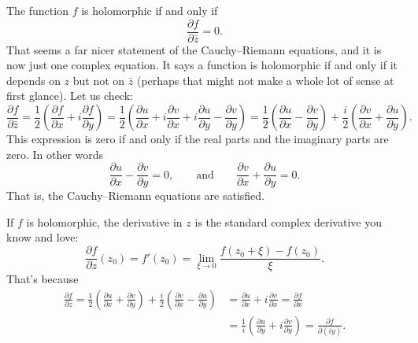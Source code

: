 \documentclass[12pt,openany]{book}
\theoremstyle{plain}
\theoremstyle{remark}
\theoremstyle{definition}
\theoremstyle{exercise}
\theoremstyle{example}
\begin{document}
The function $f$ is holomorphic if and only if
\begin{equation*}
\frac{\partial f}{\partial \bar{z}} = 0 .
\end{equation*}
That seems a far nicer statement of the Cauchy--Riemann equations, and it is
now just one complex equation.  It says
a function is holomorphic if and only if it depends on $z$ but not on
$\bar{z}$ (perhaps that might not make a whole lot of sense at first
glance).
Let us check:
\begin{equation*}
\frac{\partial f}{\partial \bar{z}} 
=
\frac{1}{2}
\left(
\frac{\partial f}{\partial x} + i
\frac{\partial f}{\partial y}
\right)
=
\frac{1}{2}
\left(
\frac{\partial u}{\partial x} 
+ i \frac{\partial v}{\partial x} 
+ i \frac{\partial u}{\partial y}
- \frac{\partial v}{\partial y}
\right) 
=
\frac{1}{2}
\left(
\frac{\partial u}{\partial x} 
- \frac{\partial v}{\partial y}
\right)
+
\frac{i}{2}
\left(
\frac{\partial v}{\partial x} 
+ \frac{\partial u}{\partial y}
\right) .
\end{equation*}
This expression is zero if and only if the real parts and the imaginary
parts are zero.  In other words %
\begin{equation*}
\frac{\partial u}{\partial x} 
- \frac{\partial v}{\partial y}
= 0,
\qquad
\text{and}
\qquad
\frac{\partial v}{\partial x} 
+ \frac{\partial u}{\partial y} = 0
.
\end{equation*}
That is, the Cauchy--Riemann equations are satisfied.

If $f$ is holomorphic, the derivative in $z$ is the standard complex derivative you know and love:
\begin{equation*}
\frac{\partial f}{\partial z} (z_0)
=
f'(z_0)
=
\lim_{\xi \to 0} \frac{f(z_0+\xi)-f(z_0)}{\xi} .
\end{equation*}
That's because 
\begin{equation*}
\begin{split}
\frac{\partial f}{\partial z} 
=
\frac{1}{2}
\left(
\frac{\partial u}{\partial x} 
+ \frac{\partial v}{\partial y}
\right)
+
\frac{i}{2}
\left( \frac{\partial v}{\partial x} - \frac{\partial u}{\partial y}
\right) 
& =
\frac{\partial u}{\partial x} 
+ i \frac{\partial v}{\partial x}
 =
\frac{\partial f}{\partial x}
\\
& =
\frac{1}{i} \left(
\frac{\partial u}{\partial y}
+ i
\frac{\partial v}{\partial y} 
\right)
 =
\frac{\partial f}{\partial (iy)}
.
\end{split}
\end{equation*}
\end{document}
